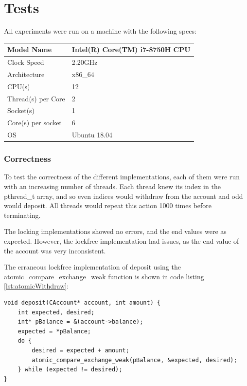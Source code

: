 \documentclass[12pt]{article}
\begin{document}
\part{Tests}

All experiments were run on a machine with the following specs:
\begin{center}
\begin{tabu} to 1.0 \textwidth { | X[l] | X[l] | }
 \hline
 Model Name  & Intel(R) Core(TM) i7-8750H CPU \\ 
 \hline
 Clock Speed & 2.20GHz \\
 \hline
 Architecture  & x86\_64 \\
 \hline
 CPU(s)    & 12 \\
 \hline
 Thread(s) per Core & 2 \\
 \hline
 Socket(s) & 1 \\
 \hline 
 Core(s) per socket & 6 \\
 \hline
 OS       & Ubuntu 18.04 \\
 \hline
\end{tabu}
\end{center}

\section{Correctness}

To test the correctness of the different implementations, each of them were run with an increasing number of threads. Each thread knew its index in the pthread\_t array, and so even indices would withdraw from the account and odd would deposit. All threads would repeat this action 1000 times before terminating.

The locking implementations showed no errors, and the end values were as expected. However, the lockfree implementation had issues, as the end value of the account was very inconsistent. 

The erraneous lockfree implementation of deposit using the \url{atomic_compare_exchange_weak} function is shown in code listing \ref{lst:atomicWithdraw}:
\begin{lstlisting}[float, floatplacement=H, caption={Withdraw using Atomics}, label={lst:atomicWithdraw}]
void deposit(CAccount* account, int amount) {
    int expected, desired;
    int* pBalance = &(account->balance);
    expected = *pBalance;
    do {
        desired = expected + amount;
        atomic_compare_exchange_weak(pBalance, &expected, desired);
    } while (expected != desired);
}
\end{lstlisting}
\end{document}
